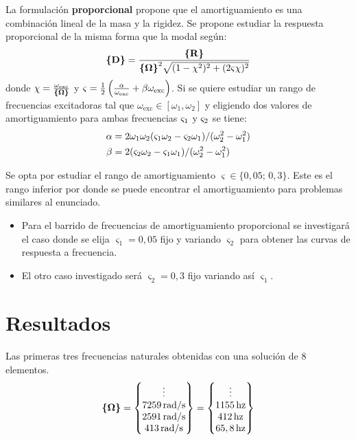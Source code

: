 \documentclass[onecolumn,10pt,titlepage,a4paper]{article}
\begin{document}
La formulación \textbf{proporcional} propone que el amortiguamiento es una combinación lineal de la masa y la rigidez. Se propone estudiar la respuesta proporcional de la misma forma que la modal según:
\begin{equation}
	\Cme{D} = \frac{\Cme{R }}{{\Cme{\Omega}}^2 \sqrt{(1-\chi^2)^2 + (2 \dampfact \chi)^2}}
\end{equation}
donde $\chi = \frac{\omega_{\mathrm{exc}}}{\Cme{\Omega}}$ y 
$\dampfact = \tfrac{1}{2} \left(\frac{\alpha}{\omega_{\mathrm{exc}}} +\beta \omega_{\mathrm{exc}} \right) $.
Si se quiere estudiar un rango de frecuencias excitadoras tal que $\omega_{\mathrm{exc}}\in [\omega_1, \omega_2]$ y eligiendo dos valores de amortiguamiento para ambas frecuencias $\dampfact_1$ y $\dampfact_2$ se tiene: \cite{cook2007concepts}
\begin{align} \label{eq:alfabeta}
\alpha &= 2\omega_1 \omega_2 (\dampfact_1 \omega_2 -\dampfact_2 \omega_1)/(\omega_2^2 - \omega_1^2) \\ \beta &= 2(\dampfact_2\omega_2 -\dampfact_1 \omega_1)/(\omega_2^2 - \omega_1^2)
\end{align}

Se opta por estudiar el rango de amortiguamiento  $\varsigma\in \{0,05;\, 0,3\}$. Este es el rango inferior por donde se puede encontrar el amortiguamiento para problemas similares al enunciado.
\begin{itemize}
	\item Para el barrido de frecuencias de amortiguamiento proporcional se investigará el caso donde se elija $\varsigma_1=0,05$ fijo y variando $\varsigma_2$ para obtener las curvas de respuesta a frecuencia.
	\item El otro caso investigado será $\varsigma_2=0,3$ fijo variando así $\varsigma_1$.
\end{itemize}

\section{Resultados}
Las primeras tres frecuencias naturales obtenidas con una solución de 8 elementos.
\[
\Cme{\Omega} = \begin{Bmatrix}
\vdots \\
7259 \si{\, \radian \per \second}\\
2591 \si{\, \radian \per \second}\\
413 \si{\, \radian \per \second}
\end{Bmatrix}=\begin{Bmatrix}
\vdots \\
1155\, \textrm{hz}\\
412\, \textrm{hz}\\
65,8\, \textrm{hz} 
\end{Bmatrix}
\]
\end{document}
